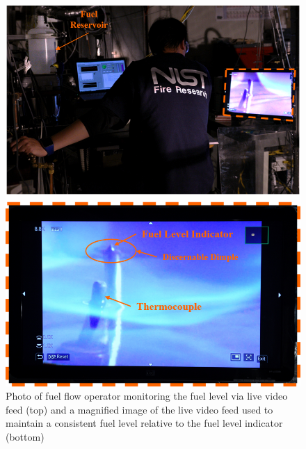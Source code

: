 \documentclass[12pt]{article}
\begin{document}
\begin{figure}[h!]
	\centering
\includegraphics[width=14.0cm,keepaspectratio]{Monitoring_Fuel_Level_A.png}
	\caption[Photographs of the fuel monitoring process]{Photo of fuel flow operator monitoring the fuel level via live video feed (top) and a magnified image of the live video feed used to maintain a consistent fuel level relative to the fuel level indicator (bottom)}
	\label{fig:Fuel_Level}
\end{figure}
\end{document}
